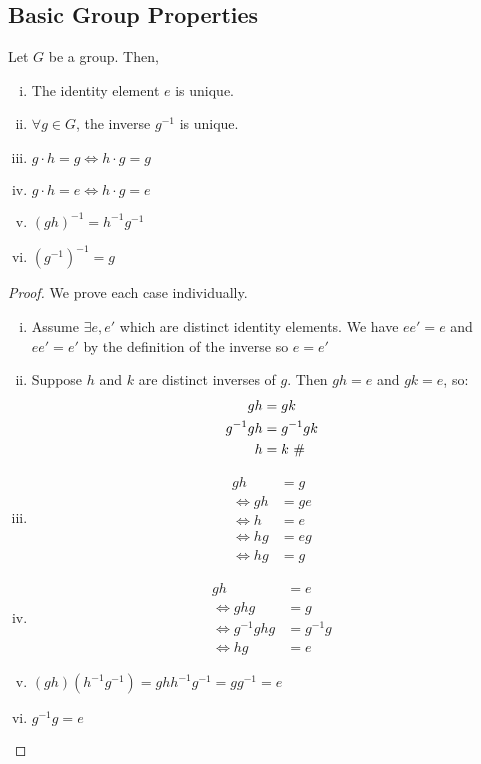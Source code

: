 \documentclass{article}
\begin{document}
\subsection{Basic Group Properties}
\begin{proposition}
	Let $G$ be a group. Then,
	\begin{enumerate}[i.]
		\item The identity element $e$ is unique.
		\item $\forall g \in G$, the inverse $g^{-1}$ is unique.
		\item $g \cdot h = g \iff h \cdot g = g$
		\item $g \cdot h = e \iff h \cdot g = e$
		\item $(gh)^{-1} = h^{-1} g^{-1}$
		\item $(g^{-1})^{-1} = g$
	\end{enumerate}
\end{proposition}
\begin{proof}
	We prove each case individually.
	\begin{enumerate}[i.]
		\item Assume $\exists e, e'$ which are distinct identity elements. We have $e e' = e$ and $e e' = e'$ by the definition of the inverse so $e = e'$ \contradiction
		\item Suppose $h$ and $k$ are distinct inverses of $g$. Then $gh = e$ and $gk = e$, so:
		      \begin{align*}
			      gh        & = gk                       \\
			      g^{-1} gh & = g^{-1} gk                \\
			      h         & = k \text{ $\#$}
		      \end{align*}
		\item \begin{align*}
			      gh      & = g  \\
			      \iff gh & = ge \\
			      \iff h  & = e  \\
			      \iff hg & = eg \\
			      \iff hg & = g
		      \end{align*}
		\item \begin{align*}
			      gh              & = e       \\
			      \iff ghg        & = g       \\
			      \iff g^{-1} ghg & = g^{-1}g \\
			      \iff hg         & = e
		      \end{align*}
		\item $(gh) (h^{-1}g^{-1}) = g h h^{-1} g^{-1} = g g^{-1} = e$
		\item $g^{-1} g = e$
	\end{enumerate}
\end{proof}
\end{document}
